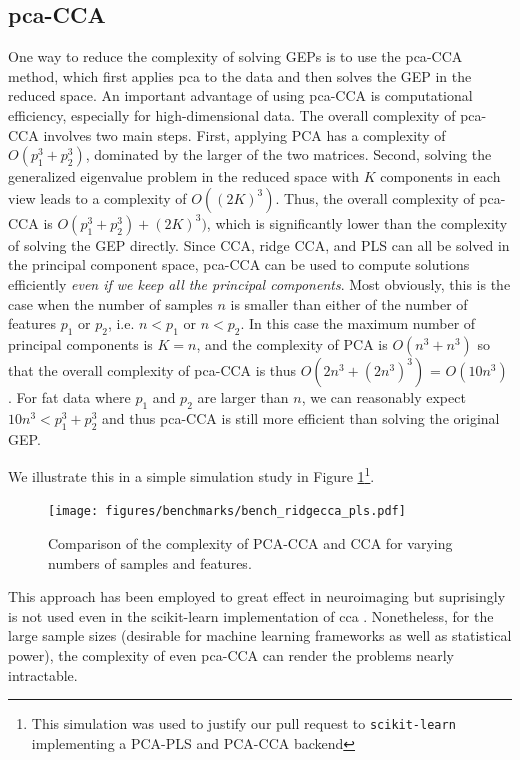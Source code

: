 \subsection{\acrshort{pca}-CCA}

One way to reduce the complexity of solving GEPs is to use the \acrshort{pca}-CCA method, which first applies \acrshort{pca} to the data and then solves the GEP in the reduced space.
An important advantage of using \acrshort{pca}-CCA is computational efficiency, especially for high-dimensional data.
The overall complexity of \acrshort{pca}-CCA involves two main steps.
First, applying PCA has a complexity of \( O(p_1^3+ p_2^3) \), dominated by the larger of the two matrices.
Second, solving the generalized eigenvalue problem in the reduced space with \( K \) components in each view leads to a complexity of \( O((2K)^3) \).
Thus, the overall complexity of \acrshort{pca}-CCA is \( O(p_1^3+ p_2^3) + (2K)^3) \), which is significantly lower than the complexity of solving the GEP directly.
Since CCA, ridge CCA, and PLS can all be solved in the principal component space, \acrshort{pca}-CCA can be used to compute solutions efficiently \textit{even if we keep all the principal components}.
Most obviously, this is the case when the number of samples \( n \) is smaller than either of the number of features \( p_1 \) or \( p_2 \), i.e. \( n < p_1 \) or \( n < p_2 \).
In this case the maximum number of principal components is \( K=n \), and the complexity of PCA is \( O(n^3+ n^3) \) so that the overall complexity of \acrshort{pca}-CCA is thus \( O(2n^3+(2n^3)^3) \) = \( O(10n^3) \).
For fat data where \( p_1 \) and \( p_2 \) are larger than \( n \), we can reasonably expect $10n^3<p_1^3+ p_2^3$ and thus \acrshort{pca}-CCA is still more efficient than solving the original GEP.

We illustrate this in a simple simulation study in Figure \ref{fig:pca-cca-complexity}\footnote{This simulation was used to justify our pull request to \texttt{scikit-learn}\citep{pedregosa2011scikit} implementing a PCA-PLS and PCA-CCA backend}.

\begin{figure}
    \centering
    \texttt{[image: figures/benchmarks/bench\_ridgecca\_pls.pdf]}
    \caption{Comparison of the complexity of PCA-CCA and CCA for varying numbers of samples and features.}
    \label{fig:pca-cca-complexity}
\end{figure}

This approach has been employed to great effect in neuroimaging but suprisingly is not used even in the scikit-learn implementation of \acrshort{cca} \citep{pedregosa2011scikit}.
Nonetheless, for the large sample sizes (desirable for machine learning frameworks as well as statistical power), the complexity of even \acrshort{pca}-CCA can render the problems nearly intractable.

